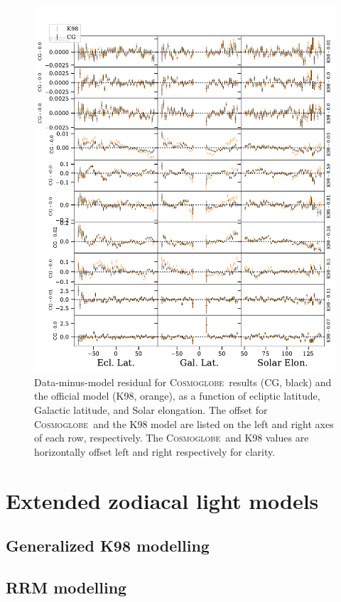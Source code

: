 \documentclass{aa}
\def\cosmoglobe{\textsc{Cosmoglobe}}
\begin{document}
\begin{figure}
    \centering
	 \includegraphics[width=0.8\linewidth]{figs/tod_zodi_residuals.pdf}
	\caption{Data-minus-model residual for \cosmoglobe\ results (CG, black) and the official \citet{k98} model (K98, orange), as a function of ecliptic latitude, Galactic latitude, and Solar elongation. The offset for \cosmoglobe\ and the K98 model are listed on the left and right axes of each row, respectively. The \cosmoglobe\ and K98 values are horizontally offset left and right respectively for clarity.}
      \label{fig: zodi_timestream}
  \end{figure}




\clearpage
\section{Extended zodiacal light models}

\subsection{Generalized K98 modelling}

\subsection{RRM modelling}
\end{document}
